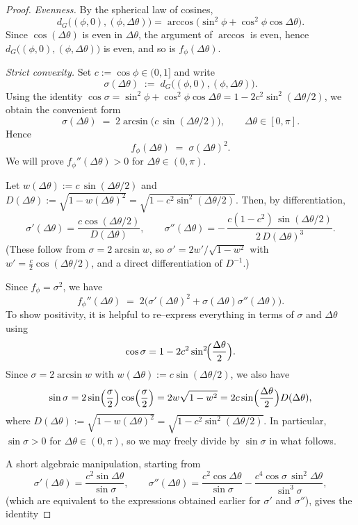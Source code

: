 \documentclass[10pt,a4paper]{amsart}
\begin{document}
\begin{proof}
\emph{Evenness.} By the spherical law of cosines,
\[
d_G\!\big((\phi,0),(\phi,\Delta\theta)\big)
= \arccos\!\Big(\sin^2\phi+\cos^2\phi\cos\Delta\theta\Big).
\]
Since $\cos(\Delta\theta)$ is even in $\Delta\theta$, the argument of $\arccos$ is even, hence
$d_G\big((\phi,0),(\phi,\Delta\theta)\big)$ is even, and so is $f_\phi(\Delta\theta)$.

\medskip
\emph{Strict convexity.} Set $c:=\cos\phi\in(0,1]$ and write
\[
\sigma(\Delta\theta)
\;:=\; d_G\!\big((\phi,0),(\phi,\Delta\theta)\big).
\]
Using the identity $\cos\sigma
=\sin^2\phi+\cos^2\phi\cos\Delta\theta
=1-2c^2\sin^2(\Delta\theta/2)$, we obtain the convenient form
\[
\sigma(\Delta\theta)\;=\;2\arcsin\!\big(c\,\sin(\Delta\theta/2)\big),\qquad \Delta\theta\in[0,\pi].
\]
Hence
\[
f_\phi(\Delta\theta)\;=\;\sigma(\Delta\theta)^2.
\]
We will prove $f_\phi''(\Delta\theta)>0$ for $\Delta\theta\in(0,\pi)$.

Let $w(\Delta\theta):=c\,\sin(\Delta\theta/2)$ and $D(\Delta\theta):=\sqrt{1-w(\Delta\theta)^2}
=\sqrt{1-c^2\sin^2(\Delta\theta/2)}$. Then, by differentiation,
\[
\sigma'(\Delta\theta)
=\frac{c\cos(\Delta\theta/2)}{D(\Delta\theta)},
\qquad
\sigma''(\Delta\theta)
=-\,\frac{c(1-c^2)\,\sin(\Delta\theta/2)}{2\,D(\Delta\theta)^3}.
\]
(These follow from $\sigma=2\arcsin w$, so $\sigma'=2w'/\sqrt{1-w^2}$ with
$w'= \tfrac{c}{2}\cos(\Delta\theta/2)$, and a direct differentiation of $D^{-1}$.)

Since $f_\phi=\sigma^2$, we have
\[
f_\phi''(\Delta\theta)\;=\;2\big(\sigma'(\Delta\theta)^2+\sigma(\Delta\theta)\sigma''(\Delta\theta)\big).
\]
To show positivity, it is helpful to re–express everything in terms of $\sigma$ and $\Delta\theta$ using
\[
\cos \sigma = 1 - 2c^{2}\sin^{2}\!\Bigl(\frac{\Delta\theta}{2}\Bigr).
\]
Since $\sigma = 2\arcsin w$ with $w(\Delta\theta) := c\sin(\Delta\theta/2)$, we also have
\[
\sin\sigma
 = 2\sin\Bigl(\frac{\sigma}{2}\Bigr)\cos\Bigl(\frac{\sigma}{2}\Bigr)
 = 2w\sqrt{1-w^{2}}
 = 2c\sin\Bigl(\frac{\Delta\theta}{2}\Bigr)D(\Delta\theta),
\]
where $D(\Delta\theta) := \sqrt{1-w(\Delta\theta)^{2}} = \sqrt{1-c^{2}\sin^{2}(\Delta\theta/2)}$.
In particular, $\sin\sigma > 0$ for $\Delta\theta \in (0,\pi)$, so we may freely divide by $\sin\sigma$ in what follows.

A short algebraic manipulation, starting from
\[
\sigma'(\Delta\theta)
 = \frac{c^{2}\sin\Delta\theta}{\sin\sigma},
\qquad
\sigma''(\Delta\theta)
 = \frac{c^{2}\cos\Delta\theta}{\sin\sigma}
   - \frac{c^{4}\cos\sigma\,\sin^{2}\Delta\theta}{\sin^{3}\sigma},
\]
(which are equivalent to the expressions obtained earlier for $\sigma'$ and $\sigma''$),
gives the identity




\end{proof}
\end{document}
